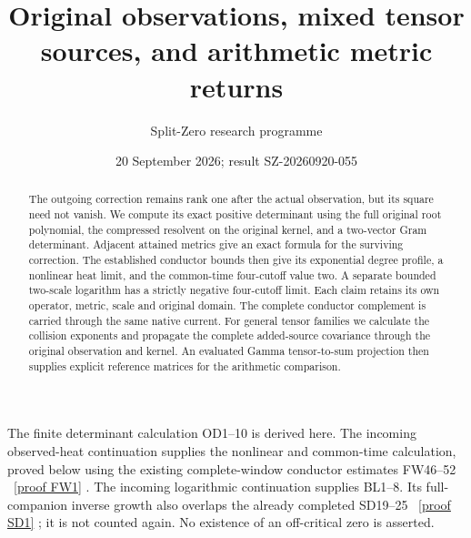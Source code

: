 \documentclass[11pt]{article}
\title{Original observations, mixed tensor sources, and arithmetic metric returns}
\author{Split-Zero research programme}
\date{20 September 2026; result SZ-20260920-055}
\begin{document}
\maketitle
\begin{abstract}
The outgoing correction remains rank one after the actual observation,
but its square need not vanish. We compute its exact positive determinant
using the full original root polynomial, the compressed resolvent on the
original kernel, and a two-vector Gram determinant. Adjacent attained
metrics give an exact formula for the surviving correction. The established
conductor bounds then give its exponential degree profile, a nonlinear
heat limit, and the common-time four-cutoff value two. A separate bounded
two-scale logarithm has a strictly negative four-cutoff limit. Each claim
retains its own operator, metric, scale and original domain. The complete
conductor complement is carried through the same native current.
For general tensor families we calculate the collision exponents and
propagate the complete added-source covariance through the original
observation and kernel. An evaluated Gamma tensor-to-sum projection
then supplies explicit reference matrices for the arithmetic comparison.
\end{abstract}

The finite determinant calculation OD1--10 is derived here. The incoming
observed-heat continuation \cite{OHinput} supplies the nonlinear and
common-time calculation, proved below using the existing complete-window
conductor estimates FW46--52 \cite{FW}%
~\href{https://github.com/KokunoYumeto/zeta-function-research-reader/blob/5992ad50c0f2a06921f1fcaded7b4e38097c0739/workbenches/splitzero-tandem/continuations/20260920-original-kernel-mixed-determinants/providers/FULL_WINDOW_SOURCE_PRODUCTS.tex\#L28}{[proof FW1]}%
{}. The incoming logarithmic
continuation \cite{BLinput} supplies BL1--8. Its full-companion inverse
growth also overlaps the already completed SD19--25 \cite{SD}%
~\href{https://github.com/KokunoYumeto/zeta-function-research-reader/blob/5992ad50c0f2a06921f1fcaded7b4e38097c0739/workbenches/splitzero-tandem/continuations/20260920-original-kernel-mixed-determinants/providers/ORIGINAL_SPECTRAL_DETERMINANT.tex\#L34}{[proof SD1]}%
{}; it is
not counted again. No existence of an off-critical zero is asserted.
\end{document}
